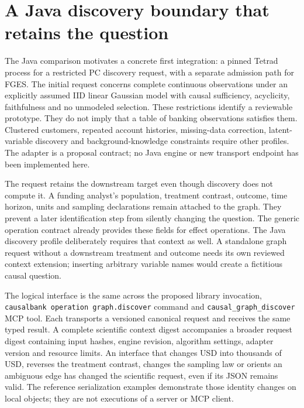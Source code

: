 \hypertarget{a-java-discovery-boundary-that-retains-the-question}{%
\section{A Java discovery boundary that retains the
question}\label{a-java-discovery-boundary-that-retains-the-question}}

\label{exec13:java-adapter}

The Java comparison motivates a concrete first integration: a pinned
Tetrad process for a restricted PC discovery request, with a separate
admission path for FGES. The initial request concerns complete
continuous observations under an explicitly assumed IID linear Gaussian
model with causal sufficiency, acyclicity, faithfulness and no unmodeled
selection. These restrictions identify a reviewable prototype. They do
not imply that a table of banking observations satisfies them. Clustered
customers, repeated account histories, missing-data correction,
latent-variable discovery and background-knowledge constraints require
other profiles. The adapter is a proposal contract; no Java engine or
new transport endpoint has been implemented here.
\citep{exec13_java_adapter_contract,exec13_java_tetrad}

The request retains the downstream target even though discovery does not
compute it. A funding analyst's population, treatment contrast, outcome,
time horizon, units and sampling declarations remain attached to the
graph. They prevent a later identification step from silently changing
the question. The generic operation contract already provides these
fields for effect operations. The Java discovery profile deliberately
requires that context as well. A standalone graph request without a
downstream treatment and outcome needs its own reviewed context
extension; inserting arbitrary variable names would create a fictitious
causal question. \citep{exec13_java_adapter_contract}

The logical interface is the same across the proposed library
invocation, \texttt{causalbank operation graph.discover} command and
\texttt{causal\_graph\_discover} MCP tool. Each transports a versioned
canonical request and receives the same typed result. A complete
scientific context digest accompanies a broader request digest
containing input hashes, engine revision, algorithm settings, adapter
version and resource limits. An interface that changes USD into
thousands of USD, reverses the treatment contrast, changes the sampling
law or orients an ambiguous edge has changed the scientific request,
even if its JSON remains valid. The reference serialization examples
demonstrate those identity changes on local objects; they are not
executions of a server or MCP client.
\citep{exec13_java_adapter_contract,exec13_java_adapter_oracles}

